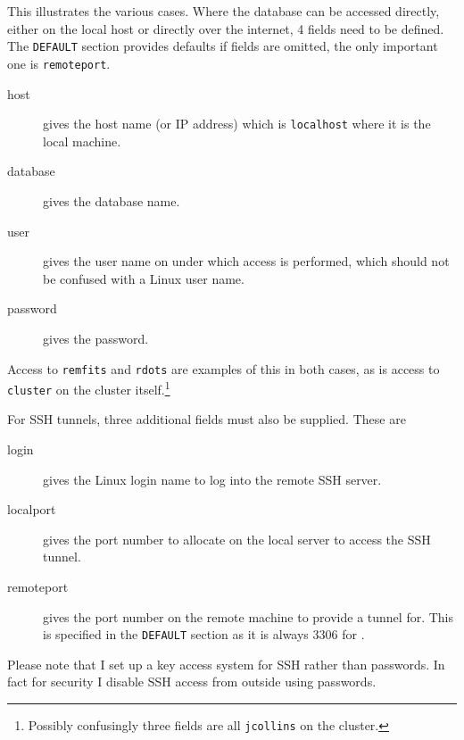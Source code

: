 This illustrates the various cases. Where the database can be accessed directly,
either on the local host or directly over the internet, 4 fields need to be
defined. The \texttt{DEFAULT} section provides defaults if fields are omitted,
the only important one is \texttt{remoteport}.

\begin{description}
\item[host] gives the host name (or IP address) which is \texttt{localhost}
where it is the local machine.
\item[database] gives the database name.
\item[user] gives the user name on {\mysql} under which access is performed,
which should not be confused with a Linux user name.
\item[password] gives the {\mysql} password.
\end{description}

Access to \texttt{remfits} and \texttt{rdots} are examples of this in both
cases, as is access to \texttt{cluster} on the cluster
itself.\footnote{Possibly confusingly three fields are all \texttt{jcollins} on
the cluster.}

For SSH tunnels, three additional fields must also be supplied. These are

\begin{description}
\item[login] gives the Linux login name to log into the remote SSH server.
\item[localport] gives the port number to allocate on the local server to access
the SSH tunnel.
\item[remoteport] gives the port number on the remote machine to provide a
tunnel for. This is specified in the \texttt{DEFAULT} section as it is always 3306
for \mysql.
\end{description}

Please note that I set up a key access system for SSH rather than passwords. In
fact for security I disable SSH access from outside using passwords.
